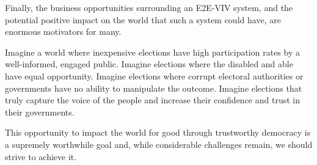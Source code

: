Finally, the business opportunities surrounding an E2E-VIV
system, and the potential positive impact on the world that such a
system could have, are enormous motivators for many.

Imagine a world where inexpensive elections have high participation
rates by a well-informed, engaged public. Imagine elections where the
disabled and able have equal opportunity. Imagine elections where
corrupt electoral authorities or governments have no ability to
manipulate the outcome. Imagine elections that truly capture the voice
of the people and increase their confidence and trust in their
governments.

This opportunity to impact the world for good through trustworthy
democracy is a supremely worthwhile goal and, while considerable
challenges remain, we should strive to achieve it.
